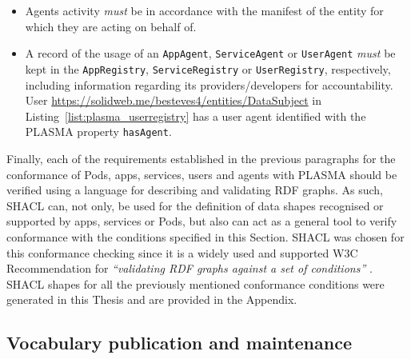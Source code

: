\begin{itemize}
    \item Agents activity \textit{must} be in accordance with the manifest of the entity for which they are acting on behalf of.
    \item A record of the usage of an \texttt{AppAgent}, \texttt{ServiceAgent} or \texttt{UserAgent} \textit{must} be kept in the \texttt{AppRegistry}, \texttt{ServiceRegistry} or \texttt{UserRegistry}, respectively, including information regarding its providers/developers for accountability. User \url{https://solidweb.me/besteves4/entities/DataSubject} in Listing~\ref{list:plasma_userregistry} has a user agent identified with the PLASMA property \texttt{hasAgent}.
\end{itemize}

Finally, each of the requirements established in the previous paragraphs for the conformance of Pods, apps, services, users and agents with PLASMA should be verified using a language for describing and validating RDF graphs.
As such, SHACL can, not only, be used for the definition of data shapes recognised or supported by apps, services or Pods, but also can act as a general tool to verify conformance with the conditions specified in this Section.
SHACL was chosen for this conformance checking since it is a widely used and supported W3C Recommendation for \textit{``validating RDF graphs against a set of conditions''} \citep{knublauch_shapes_2017}.
SHACL shapes for all the previously mentioned conformance conditions were generated in this Thesis and are provided in the Appendix.




\subsection{Vocabulary publication and maintenance}
\label{sec:plasma_publication}

